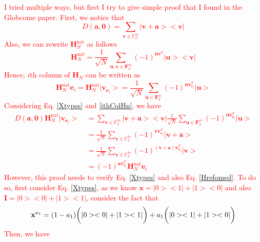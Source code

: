 \documentclass{article}
\begin{document}
	\textcolor{red}{
		I tried multiple ways, but first I try to give simple proof that I found in the Globcome paper. First, we notice that 
		\begin{equation}\label{Xtypes}
			D\left(\mathbf{a}, \mathbf{0}\right) = \sum_{\mathbf{v} \in \mathbb{F}_2^m}{|\mathbf{v+a}><\mathbf{v}|}
		\end{equation} 
		Also, we can rewrite $\mathbf{H}_N^{\text{nat}}$ as follows
		\begin{equation}\label{Hrefomed}
			\mathbf{H}_N^{\text{nat}} = \frac{1}{\sqrt{N}} \sum_{\mathbf{u}, \mathbf{v} \in \mathbf{F}_2^m}{\left(-1\right)^{\mathbf{u} \mathbf{v}^T } |\mathbf{u}><\mathbf{v}|}
		\end{equation}
		Hence, $i$th column of $\mathbf{H}_N$ can be written as 
		\begin{equation}\label{ithColHn}
			\mathbf{H}_N^{\text{nat}} \mathbf{e}_i = \mathbf{H}_N^{\text{nat}} | \mathbf{v}_{\mathbf{e}_i}> = \frac{1}{\sqrt{N}} \sum_{\mathbf{u} \in \mathbf{F}_2^m}{\left(-1\right)^{\mathbf{u} \mathbf{v}_{\mathbf{e}_i}^T } |\mathbf{u}>}
		\end{equation}
		Considering Eq. \eqref{Xtypes} and \eqref{ithColHn}, we have
		\begin{align*}
			D\left(\mathbf{a}, \mathbf{0} \right) \mathbf{H}_N^{\text{nat}} | \mathbf{v}_{\mathbf{e}_i} > \: & = \sum_{\mathbf{v} \in \mathbb{F}_2^m}{|\mathbf{v+a}><\mathbf{v}|}  \frac{1}{\sqrt{N}} \sum_{\mathbf{u} \in \mathbf{F}_2^m}{\left(-1\right)^{\mathbf{u} \mathbf{v}_{\mathbf{e}_i}^T } |\mathbf{u} > } \\
			& = \frac{1}{\sqrt{N}} \sum_{\mathbf{v} \in \mathbb{F}_2^m}{(-1)^{\mathbf{v}\mathbf{v}_{\mathbf{e}_i}^T } |\mathbf{v+a}>} \\
			& = \frac{1}{\sqrt{N}} \sum_{\mathbf{v} \in \mathbb{F}_2^m}{(-1)^{\left(\mathbf{v+a}\right)\mathbf{v}_{\mathbf{e}_i}^T } |\mathbf{v}>}\\
			& = (-1)^{\mathbf{a}\mathbf{v}_{\mathbf{e}_i}^T} \mathbf{H}_N^{\text{nat}} \mathbf{e}_i
		\end{align*} 
		However, this proof needs to verify Eq. \eqref{Xtypes} and also Eq. \eqref{Hrefomed}. To do so, first consider Eq. \eqref{Xtypes}, as we know $\mathbf{x} = |0><1| + |1><0|$ and also $\mathbf{I} = |0><0| + |1><1|$, consider the fact that 
		\begin{equation*}
			\mathbf{x}^{a_1}  = (1-a_1)\bigg{(}|0><0| + |1><1|\bigg{)}+a_1 \bigg{(} |0><1| + |1><0| \bigg{)}
		\end{equation*}
		Then, we have
		\begin{align*}

\end{align*}}
\end{document}
